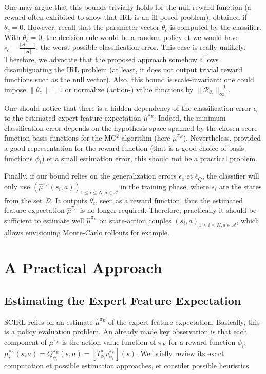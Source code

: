 \documentclass[english,utf8]{./hermes-journal}
\newcommand{\R}{\mathcal{R}}
\newcommand{\A}{\mathcal{A}}
\newcommand{\D}{\mathcal{D}}
\begin{document}
One may argue that this bounds trivially holds for the null reward
function (a reward often exhibited to show that IRL is an ill-posed
problem), obtained if $\theta_c=0$. However, recall that the
parameter vector $\theta_c$ is computed by the classifier. With
$\theta_c=0$, the decision rule would be a random policy et we
would have $\epsilon_c = \frac{|\A|-1}{|\A|}$, the worst possible
classification error. This case is really unlikely. Therefore, we
advocate that the proposed approach somehow allows disambiguating
the IRL problem (at least, it does not output trivial reward
functions such as the null vector).
%
Also, this bound is scale-invariant: one could impose
$\|\theta_c\|=1$ or normalize (action-) value functions by
$\|\R_{\theta_c}\|_\infty^{-1}$.

One should notice that there is a hidden dependency of the
classification error $\epsilon_c$ to the estimated expert feature
expectation $\hat{\mu}^{\pi_E}$. Indeed, the minimum classification
error depends on the hypothesis space spanned by the chosen score
function basis functions for the MC$^2$ algorithm (here
$\hat{\mu}^{\pi_E}$). Nevertheless, provided a good representation
for the reward function (that is a good choice of basis functions
$\phi_i$) et a small estimation error, this should not be a
practical problem.

Finally, if our bound relies on the generalization errors
$\epsilon_c$ et $\bar{\epsilon}_Q$, the classifier will only use
$(\hat{\mu}^{\pi_E}(s_i,a))_{1\leq i\leq N,a\in\A}$ in the training
phase, where $s_i$ are the states from the set $\D$. It outputs
$\theta_c$, seen as a reward function, thus the estimated feature
expectation $\hat{\mu}^{\pi_E}$ is no longer required. Therefore,
practically it should be sufficient to estimate well
$\hat{\mu}^{\pi_E}$ on state-action couples $(s_i,a)_{1\leq i\leq
N,a\in\A}$, which allows envisioning Monte-Carlo rollouts for
example.

\section{A Practical Approach}
\label{sec:practicalApproach}

\subsection{Estimating the Expert Feature Expectation}
\label{subsec:practicalApproach:muE}

SCIRL relies on an estimate $\hat{\mu}^{\pi_E}$ of the expert
feature expectation. Basically, this is a policy evaluation problem.
An already made key observation is that each component of
$\mu^{\pi_E}$ is the action-value function of $\pi_E$ for a reward
function $\phi_i$: $\mu_i^{\pi_E}(s,a) = Q^{\pi_E}_{\phi_i}(s,a) =
[T^a_{\phi_i} v^{\pi_E}_{\phi_i}](s)$. We briefly review its exact
computation et possible estimation approaches, et consider
possible heuristics.
\end{document}
